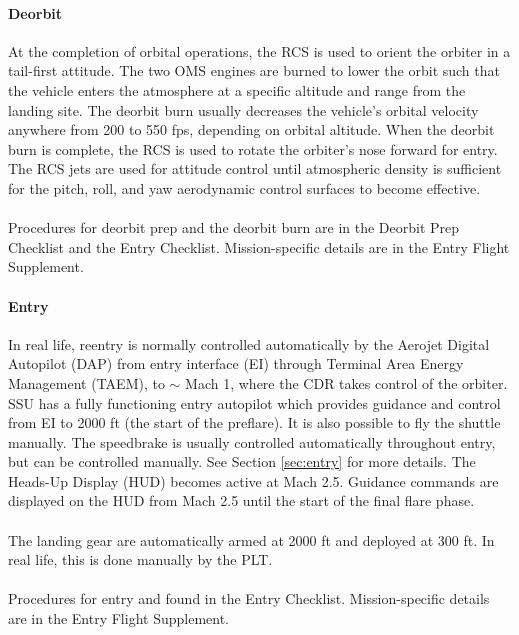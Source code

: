 \documentclass[13pt]{article}
\begin{document}
\begin{multicols*}{2}
\paragraph{Deorbit}
At the completion of orbital operations, the RCS is used to orient the orbiter in a tail-first attitude. The two OMS engines are burned to lower the orbit such that the vehicle enters the atmosphere at a specific altitude and range from the landing site. The deorbit burn usually decreases the vehicle's orbital velocity anywhere from 200 to 550 fps, depending on orbital altitude.  When the deorbit burn is complete, the RCS is used to rotate the orbiter's nose forward for entry. The RCS jets are used for attitude control until atmospheric density is sufficient for the pitch, roll, and yaw aerodynamic control surfaces to become effective. \\
\\
Procedures for deorbit prep and the deorbit burn are in the Deorbit Prep Checklist and the Entry Checklist. Mission-specific details are in the Entry Flight Supplement.
\paragraph{Entry}
In real life, reentry is normally controlled automatically by the Aerojet Digital Autopilot (DAP) from entry interface (EI) through Terminal Area Energy Management (TAEM), to $\sim$ Mach 1, where the CDR takes control of the orbiter. SSU has a fully functioning entry autopilot which provides guidance and control from EI to 2000 ft (the start of the preflare). It is also possible to fly the shuttle manually. The speedbrake is usually controlled automatically throughout entry, but can be controlled manually. See Section \ref{sec:entry} for more details.
The Heads-Up Display (HUD) becomes active at Mach 2.5. Guidance commands are displayed on the HUD from Mach 2.5 until the start of the final flare phase. \\
\\
The landing gear are automatically armed at 2000 ft and deployed at 300 ft. In real life, this is done manually by the PLT. \\
\\
Procedures for entry and found in the Entry Checklist. Mission-specific details are in the Entry Flight Supplement.
\vfill

\end{multicols*}
\end{document}
